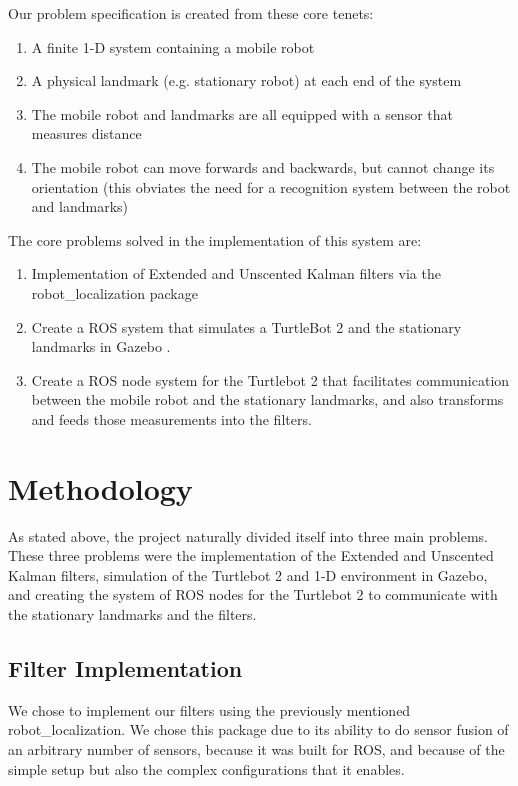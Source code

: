 \documentclass[conference]{IEEEtran}
\begin{document}
Our problem specification is created from these core tenets:
\begin{enumerate}
\item A finite 1-D system containing a mobile robot
\item A physical landmark (e.g. stationary robot) at each end of the system
\item The mobile robot and landmarks are all equipped with a sensor that measures distance
\item The mobile robot can move forwards and backwards, but cannot change its orientation (this obviates the need for a
recognition system between the robot and landmarks)
\end{enumerate}

The core problems solved in the implementation of this system are:
\begin{enumerate}
\item Implementation of Extended and Unscented Kalman filters via the robot\_localization package
\cite{robot_localization}
\item Create a ROS \cite{ros_original} system that simulates a TurtleBot 2 and the stationary landmarks in Gazebo
\cite{gazebo}.
\item Create a ROS node system for the Turtlebot 2 that facilitates communication between the mobile robot and the 
stationary landmarks, and also transforms and feeds those measurements into the filters.
\end{enumerate}


\section{Methodology}
As stated above, the project naturally divided itself into three main problems. These three problems were the
implementation of the Extended and Unscented Kalman filters, simulation of the Turtlebot 2 and 1-D environment in 
Gazebo, and creating the system of ROS nodes for the Turtlebot 2 to communicate with the stationary landmarks and the 
filters.

\subsection{Filter Implementation}
We chose to implement our filters using the previously mentioned robot\_localization. We chose this package due to its 
ability to do sensor fusion of an arbitrary number of sensors, because it was built for ROS, and because of the simple 
setup but also the complex configurations that it enables.
\end{document}
